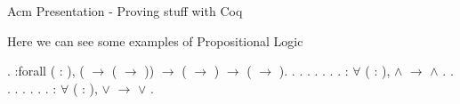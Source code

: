 \documentclass[12pt]{report}
\begin{document}

\begin{coqdoccode}
\end{coqdoccode}
Acm Presentation - Proving stuff with Coq


\begin{coqdoccode}
\coqdocemptyline
\end{coqdoccode}
Here we can see some examples of Propositional Logic \begin{coqdoccode}
\coqdocemptyline
\coqdocnoindent
{}  .\coqdoceol
\coqdocemptyline
\coqdocnoindent
{}  :forall (  : ), \coqdoceol
\coqdocindent{1.00em}
( \ensuremath{\rightarrow} ( \ensuremath{\rightarrow} )) \ensuremath{\rightarrow} ( \ensuremath{\rightarrow} ) \ensuremath{\rightarrow} ( \ensuremath{\rightarrow} ).\coqdoceol
\coqdocnoindent
{}.\coqdoceol
\coqdocindent{1.00em}
      .\coqdoceol
\coqdocindent{1.00em}
 .\coqdoceol
\coqdocindent{1.00em}
 .\coqdoceol
\coqdocindent{1.00em}
 .\coqdoceol
\coqdocindent{1.00em}
.\coqdoceol
\coqdocnoindent
{}.\coqdoceol
\coqdocemptyline
\coqdocnoindent
{}  : \ensuremath{\forall} (  : ),  \ensuremath{\land}  \ensuremath{\rightarrow}  \ensuremath{\land} .\coqdoceol
\coqdocnoindent
{}.\coqdoceol
\coqdocnoindent
{}   .\coqdoceol
\coqdocnoindent
{} .\coqdoceol
\coqdocnoindent
{}.\coqdoceol
\coqdocnoindent
{} .\coqdoceol
\coqdocnoindent
{} .\coqdoceol
\coqdocnoindent
{}.\coqdoceol
\coqdocemptyline
\coqdocnoindent
{}  : \ensuremath{\forall} (  : ),  \ensuremath{\lor}  \ensuremath{\rightarrow}  \ensuremath{\lor} .\coqdoceol

\end{coqdoccode}
\end{document}
